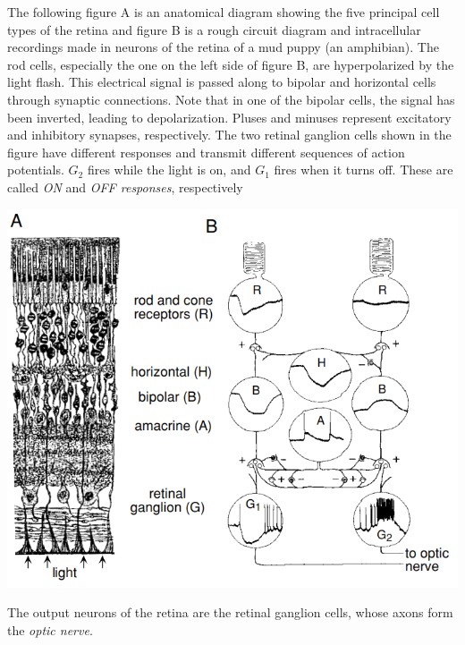 \begin{exm}
  The following figure A is an anatomical diagram showing the five principal cell types of the retina and figure B is a rough circuit diagram and intracellular recordings made in neurons of the retina of a mud puppy (an amphibian). The rod cells, especially the one on the left side of figure B, are hyperpolarized by the light flash. This electrical signal is passed along to bipolar and horizontal cells through synaptic connections. Note that in one of the bipolar cells, the signal has been inverted, leading to depolarization. Pluses and minuses represent excitatory and inhibitory synapses, respectively.
  The two retinal ganglion cells shown in the figure have different responses and transmit different sequences of action potentials. $G_2$ fires while the light is on, and $G_1$ fires when it turns off. These are called \emph{ON} and \emph{OFF responses}, respectively
  \begin{center}
    \includegraphics[scale=0.25]{./png/dogRetina}
  \end{center}
\end{exm}

\begin{ntn}
  \label{ntn:opticNerve}
  The output neurons of the retina are the retinal ganglion cells, whose axons form the \emph{optic nerve}.
\end{ntn}

